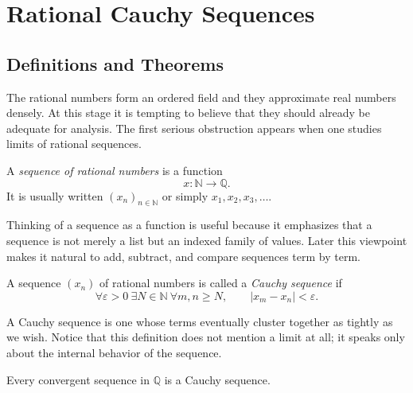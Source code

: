 
\section{Rational Cauchy Sequences}
\label{sec:rational-cauchy}

\subsection{Definitions and Theorems}

The rational numbers form an ordered field and they approximate real numbers densely.  At this
stage it is tempting to believe that they should already be adequate for analysis.  The first serious
obstruction appears when one studies limits of rational sequences.

\begin{definition}
\label{def:rational-sequence}
A \emph{sequence of rational numbers} is a function
\[
x:\mathbb{N}\to\mathbb{Q}.
\]
It is usually written $(x_n)_{n\in\mathbb{N}}$ or simply $x_1,x_2,x_3,\dots$.
\end{definition}

\begin{remark}
Thinking of a sequence as a function is useful because it emphasizes that a sequence is not merely a
list but an indexed family of values.  Later this viewpoint makes it natural to add, subtract, and
compare sequences term by term.
\end{remark}

\begin{definition}
\label{def:cauchy-rational}
A sequence $(x_n)$ of rational numbers is called a \emph{Cauchy sequence} if
\[
\forall \varepsilon>0\ \exists N\in\mathbb{N}\ \forall m,n\ge N,
\qquad
|x_m-x_n|<\varepsilon.
\]
\end{definition}

\begin{remark}
A Cauchy sequence is one whose terms eventually cluster together as tightly as we wish.  Notice that
this definition does not mention a limit at all; it speaks only about the internal behavior of the
sequence.
\end{remark}

\begin{theorem}
\label{thm:convergent-implies-cauchy-q}
Every convergent sequence in $\mathbb{Q}$ is a Cauchy sequence.
\end{theorem}

